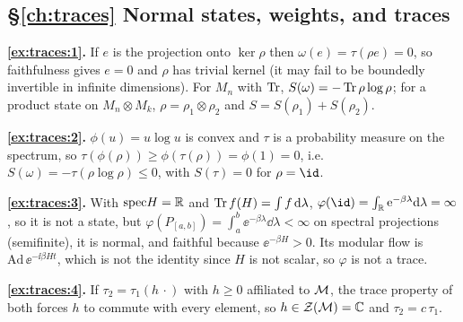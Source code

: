 {\subsection*{\S\ref{ch:traces} Normal states, weights, and traces}
\textbf{\ref{ex:traces:1}.} If $e$ is the projection onto $\ker\rho$ then $\omega(e)=\tau(\rho e)=0$, so faithfulness gives $e=0$ and $\rho$ has trivial kernel (it may fail to be boundedly invertible in infinite dimensions). For $M_n$ with $\operatorname{Tr}$, $S(\omega)=-\operatorname{Tr}\rho\log\rho$; for a product state on $M_n\otimes M_k$, $\rho=\rho_1\otimes\rho_2$ and $S=S(\rho_1)+S(\rho_2)$.\par
\textbf{\ref{ex:traces:2}.} $\phi(u)=u\log u$ is convex and $\tau$ is a probability measure on the spectrum, so $\tau(\phi(\rho))\ge\phi(\tau(\rho))=\phi(1)=0$, i.e.\ $S(\omega)=-\tau(\rho\log\rho)\le0$, with $S(\tau)=0$ for $\rho=\id$.\par
\textbf{\ref{ex:traces:3}.} With $\mathrm{spec}H=\mathbb{R}$ and $\operatorname{Tr} f(H)=\int f\,\mathrm{d}\lambda$, $\varphi(\id)=\int_\R\ee^{-\beta\lambda}\dd\lambda=\infty$, so it is not a state, but $\varphi(P_{[a,b]})=\int_a^b\ee^{-\beta\lambda}\dd\lambda<\infty$ on spectral projections (semifinite), it is normal, and faithful because $\ee^{-\beta H}>0$. Its modular flow is $\mathrm{Ad}\,\ee^{-\ii\beta Ht}$, which is not the identity since $H$ is not scalar, so $\varphi$ is not a trace.\par
\textbf{\ref{ex:traces:4}.} If $\tau_2=\tau_1(h\,\cdot)$ with $h\ge0$ affiliated to $\mathcal{M}$, the trace property of both forces $h$ to commute with every element, so $h\in\mathcal{Z}(\mathcal{M})=\mathbb{C}$ and $\tau_2=c\,\tau_1$.\par

}
